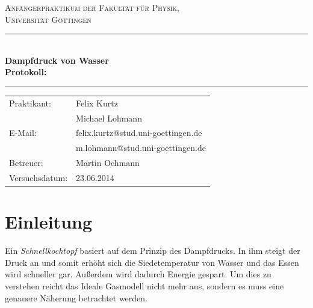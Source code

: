 \documentclass[12pt,a4paper,titlepage,headinclude,bibtotoc]{scrartcl}
\begin{document}
\begin{titlepage}
\centering
\textsc{\Large Anfängerpraktikum der Fakultät für
  Physik,\\[1.5ex] Universität Göttingen}

\vspace*{4.2cm}

\rule{\textwidth}{1pt}\\[0.5cm]
{\huge \bfseries
  Dampfdruck von Wasser\\[1.5ex]
  Protokoll:}\\[0.5cm]
\rule{\textwidth}{1pt}

\vspace*{3.0cm}

\begin{Large}
\begin{tabular}{ll}
Praktikant:
 	&  Felix Kurtz\\
 	&  Michael Lohmann\\

  E-Mail: 
	&  felix.kurtz@stud.uni-goettingen.de\\
	& m.lohmann@stud.uni-goettingen.de\\	

 Betreuer: & Martin Ochmann\\
 Versuchsdatum: & 23.06.2014\\
\end{tabular}
\end{Large}

\vspace*{0.8cm}

\begin{Large}
\end{Large}

\end{titlepage}

\tableofcontents

\newpage

\section{Einleitung}
\label{sec:einleitung}
Ein \textit{Schnellkochtopf} basiert auf dem Prinzip des Dampfdrucks.
In ihm steigt der Druck an und somit erhöht sich die Siedetemperatur von Wasser und das Essen wird schneller gar.
Außerdem wird dadurch Energie gespart.
Um dies zu verstehen reicht das Ideale Gasmodell nicht mehr aus, sondern es muss eine genauere Näherung betrachtet werden.
\end{document}

